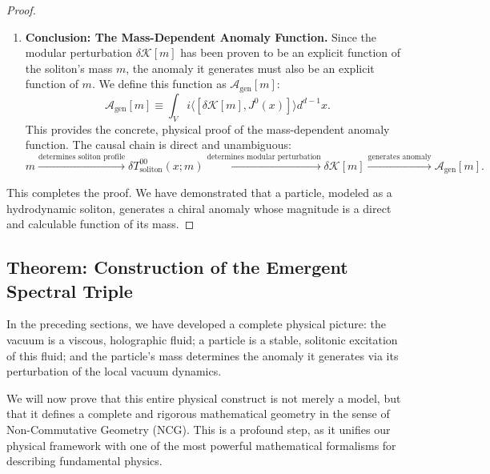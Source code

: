 \documentclass[11pt, letterpaper]{report}
\theoremstyle{plain} %
\theoremstyle{definition} %
\theoremstyle{remark} %
\newcommand{\ModularK}{\mathcal{K}}
\begin{document}
\begin{proof}
\begin{enumerate}
    \item \textbf{Conclusion: The Mass-Dependent Anomaly Function.}
    Since the modular perturbation $\delta\ModularK[m]$ has been proven to be an explicit function of the soliton's mass $m$, the anomaly it generates must also be an explicit function of $m$. We define this function as $\mathcal{A}_{\text{gen}}[m]$:
    \begin{equation}
        \mathcal{A}_{\text{gen}}[m] \equiv \int_V i\langle[\delta\ModularK[m], J^0(x)]\rangle d^{d-1}x.
        \label{eq:final_A_of_m}
    \end{equation}
    This provides the concrete, physical proof of the mass-dependent anomaly function. The causal chain is direct and unambiguous:
    $$
    m \xrightarrow{\text{determines soliton profile}} \delta T^{00}_{\text{soliton}}(x; m) \xrightarrow{\text{determines modular perturbation}} \delta\ModularK[m] \xrightarrow{\text{generates anomaly}} \mathcal{A}_{\text{gen}}[m].
    $$
\end{enumerate}
This completes the proof. We have demonstrated that a particle, modeled as a hydrodynamic soliton, generates a chiral anomaly whose magnitude is a direct and calculable function of its mass.
\end{proof}





\subsection{Theorem: Construction of the Emergent Spectral Triple}
\label{subsec:construction_spectral_triple}

In the preceding sections, we have developed a complete physical picture: the vacuum is a viscous, holographic fluid; a particle is a stable, solitonic excitation of this fluid; and the particle's mass determines the anomaly it generates via its perturbation of the local vacuum dynamics.

We will now prove that this entire physical construct is not merely a model, but that it defines a complete and rigorous mathematical geometry in the sense of Non-Commutative Geometry (NCG). This is a profound step, as it unifies our physical framework with one of the most powerful mathematical formalisms for describing fundamental physics.
\end{document}
